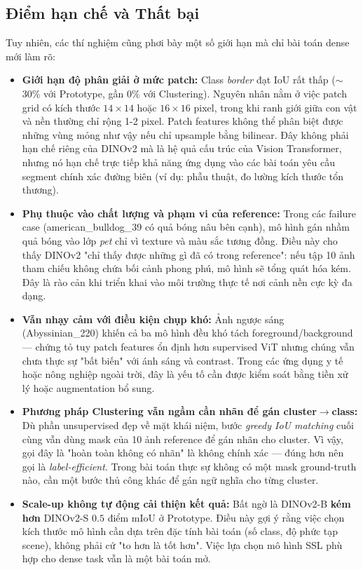 \subsection{Điểm hạn chế và Thất bại}
Tuy nhiên, các thí nghiệm cũng phơi bày một số giới hạn mà chỉ bài toán dense mới làm rõ:
\begin{itemize}
    \item \textbf{Giới hạn độ phân giải ở mức patch:} Class \textit{border} đạt IoU rất thấp ($\sim$30\% với Prototype, gần $0\%$ với Clustering). Nguyên nhân nằm ở việc patch grid có kích thước $14 \times 14$ hoặc $16 \times 16$ pixel, trong khi ranh giới giữa con vật và nền thường chỉ rộng 1-2 pixel. Patch features không thể phân biệt được những vùng mỏng như vậy nếu chỉ upsample bằng bilinear. Đây không phải hạn chế riêng của DINOv2 mà là hệ quả cấu trúc của Vision Transformer, nhưng nó hạn chế trực tiếp khả năng ứng dụng vào các bài toán yêu cầu segment chính xác đường biên (ví dụ: phẫu thuật, đo lường kích thước tổn thương).
    \item \textbf{Phụ thuộc vào chất lượng và phạm vi của reference:} Trong các failure case (american\_bulldog\_39 có quả bóng nâu bên cạnh), mô hình gán nhầm quả bóng vào lớp \textit{pet} chỉ vì texture và màu sắc tương đồng. Điều này cho thấy DINOv2 "chỉ thấy được những gì đã có trong reference": nếu tập 10 ảnh tham chiếu không chứa bối cảnh phong phú, mô hình sẽ tổng quát hóa kém. Đây là rào cản khi triển khai vào môi trường thực tế nơi cảnh nền cực kỳ đa dạng.
    \item \textbf{Vẫn nhạy cảm với điều kiện chụp khó:} Ảnh ngược sáng (Abyssinian\_220) khiến cả ba mô hình đều khó tách foreground/background — chứng tỏ tuy patch features ổn định hơn supervised ViT nhưng chúng vẫn chưa thực sự "bất biến" với ánh sáng và contrast. Trong các ứng dụng y tế hoặc nông nghiệp ngoài trời, đây là yếu tố cần được kiểm soát bằng tiền xử lý hoặc augmentation bổ sung.
    \item \textbf{Phương pháp Clustering vẫn ngầm cần nhãn để gán cluster$\rightarrow$class:} Dù phần unsupervised đẹp về mặt khái niệm, bước \textit{greedy IoU matching} cuối cùng vẫn dùng mask của 10 ảnh reference để gán nhãn cho cluster. Vì vậy, gọi đây là "hoàn toàn không có nhãn" là không chính xác — đúng hơn nên gọi là \textit{label-efficient}. Trong bài toán thực sự không có một mask ground-truth nào, cần một bước thủ công khác để gán ngữ nghĩa cho từng cluster.
    \item \textbf{Scale-up không tự động cải thiện kết quả:} Bất ngờ là DINOv2-B \textbf{kém hơn} DINOv2-S $0.5$ điểm mIoU ở Prototype. Điều này gợi ý rằng việc chọn kích thước mô hình cần dựa trên đặc tính bài toán (số class, độ phức tạp scene), không phải cứ "to hơn là tốt hơn". Việc lựa chọn mô hình SSL phù hợp cho dense task vẫn là một bài toán mở.
\end{itemize}

